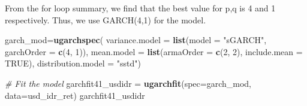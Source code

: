 \documentclass[]{article}
\newenvironment{Shaded}{\begin{snugshade}}{\end{snugshade}}
\newcommand{\KeywordTok}[1]{\textcolor[rgb]{0.13,0.29,0.53}{\textbf{#1}}}
\newcommand{\DataTypeTok}[1]{\textcolor[rgb]{0.13,0.29,0.53}{#1}}
\newcommand{\DecValTok}[1]{\textcolor[rgb]{0.00,0.00,0.81}{#1}}
\newcommand{\StringTok}[1]{\textcolor[rgb]{0.31,0.60,0.02}{#1}}
\newcommand{\CommentTok}[1]{\textcolor[rgb]{0.56,0.35,0.01}{\textit{#1}}}
\newcommand{\OtherTok}[1]{\textcolor[rgb]{0.56,0.35,0.01}{#1}}
\newcommand{\NormalTok}[1]{#1}
\begin{document}
From the for loop summary, we find that the best value for p,q is 4 and
1 respectively. Thus, we use GARCH(4,1) for the model.

\begin{Shaded}
\begin{Highlighting}[]
\NormalTok{garch_mod=}\KeywordTok{ugarchspec}\NormalTok{(}
  \DataTypeTok{variance.model =} \KeywordTok{list}\NormalTok{(}\DataTypeTok{model =} \StringTok{"sGARCH"}\NormalTok{, }\DataTypeTok{garchOrder =} \KeywordTok{c}\NormalTok{(}\DecValTok{4}\NormalTok{, }\DecValTok{1}\NormalTok{)),}
  \DataTypeTok{mean.model =} \KeywordTok{list}\NormalTok{(}\DataTypeTok{armaOrder =} \KeywordTok{c}\NormalTok{(}\DecValTok{2}\NormalTok{, }\DecValTok{2}\NormalTok{), }\DataTypeTok{include.mean =} \OtherTok{TRUE}\NormalTok{),}
  \DataTypeTok{distribution.model =} \StringTok{"sstd"}\NormalTok{)}

\CommentTok{# Fit the model}
\NormalTok{garchfit41_usdidr =}\StringTok{ }\KeywordTok{ugarchfit}\NormalTok{(}\DataTypeTok{spec=}\NormalTok{garch_mod, }\DataTypeTok{data=}\NormalTok{usd_idr_ret)}
\NormalTok{garchfit41_usdidr}
\end{Highlighting}
\end{Shaded}
\end{document}
